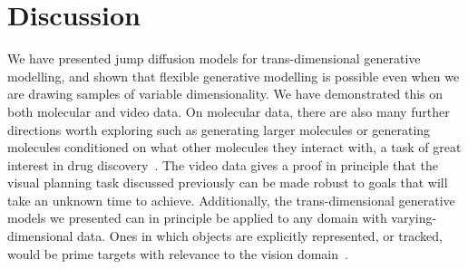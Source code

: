 \section{Discussion}
We have presented jump diffusion models for trans-dimensional generative modelling, and shown that flexible generative modelling is possible even when we are drawing samples of variable dimensionality. We have demonstrated this on both molecular and video data. On molecular data, there are also many further directions worth exploring such as generating larger molecules or generating molecules conditioned on what other molecules they interact with, a task of great interest in drug discovery~\citep{hoogeboom2022equivariant}. The video data gives a proof in principle that the visual planning task discussed previously can be made robust to goals that will take an unknown time to achieve. Additionally, the trans-dimensional generative models we presented can in principle be applied to any domain with varying-dimensional data. Ones in which objects are explicitly represented, or tracked, would be prime targets with relevance to the vision domain~\citep{luo2021multiple,niedoba2024diffusion}. 